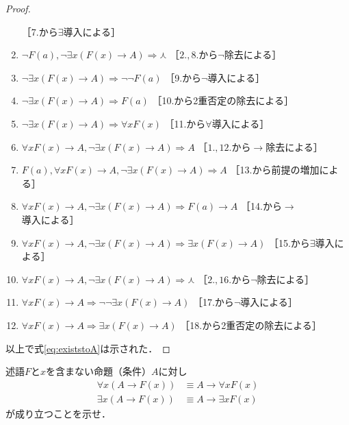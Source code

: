 \begin{proof}
\begin{enumerate}[1. ]
              \quad ［7.から$\exists$導入による］
       \item $\lnot F(a) ,  \lnot \exists x (F(x) \to A) \Longrightarrow \curlywedge$
              \quad ［$2., 8.$から$\lnot$除去による］
       \item $\lnot \exists x (F(x) \to A) \Longrightarrow \lnot \lnot F(a)$
              \quad ［9.から$\lnot$導入による］
       \item $\lnot \exists x (F(x) \to A) \Longrightarrow F(a)$ 
              \quad ［10.から2重否定の除去による］
       \item $\lnot \exists x (F(x) \to A) \Longrightarrow \forall x F(x) $
              \quad ［11.から$\forall$導入による］
       \item $\forall x F(x) \to A ,  \lnot \exists x (F(x) \to A) \Longrightarrow A$
              \quad ［$1., 12.$から$\to$除去による］
       \item $F(a) ,  \forall x F(x) \to A ,  \lnot \exists x (F(x) \to A)
              \Longrightarrow A $ \quad ［13.から前提の増加による］
       \item $\forall x F(x) \to A ,  \lnot \exists x(F(x) \to A)
              \Longrightarrow F(a) \to A$ \quad ［14.から$\to$導入による］
       \item $\forall x F(x) \to A ,  \lnot \exists x(F(x) \to A)
              \Longrightarrow \exists x(F(x) \to A)$ \quad ［15.から$\exists$導入による］
       \item $\forall x F(x) \to A ,  \lnot \exists x (F(x) \to A)
              \Longrightarrow \curlywedge$ \quad ［$2., 16.$から$\lnot$除去による］
       \item $\forall x F(x) \to A \Longrightarrow \lnot \lnot \exists x (F(x) \to A)$
              \quad ［17.から$\lnot$導入による］
       \item $\forall x F(x) \to A \Longrightarrow \exists x (F(x) \to A) $
              \quad ［18.から2重否定の除去による］
     \end{enumerate}
     以上で式\eqref{eq:existstoA}は示された．
   \end{proof}
   \begin{que} \label{que:togentei}
     述語$F$と$x$を含まない命題（条件）$A$に対し
     \begin{align}
       \forall x (A \to F(x) ) & \equiv A \to \forall x F(x) 
       \label{eq:Atoforall} \\
       \exists x (A \to F(x) ) & \equiv A \to \exists x F(x)
       \label{eq:Atoexists}
     \end{align}
     が成り立つことを示せ．
   \end{que}
